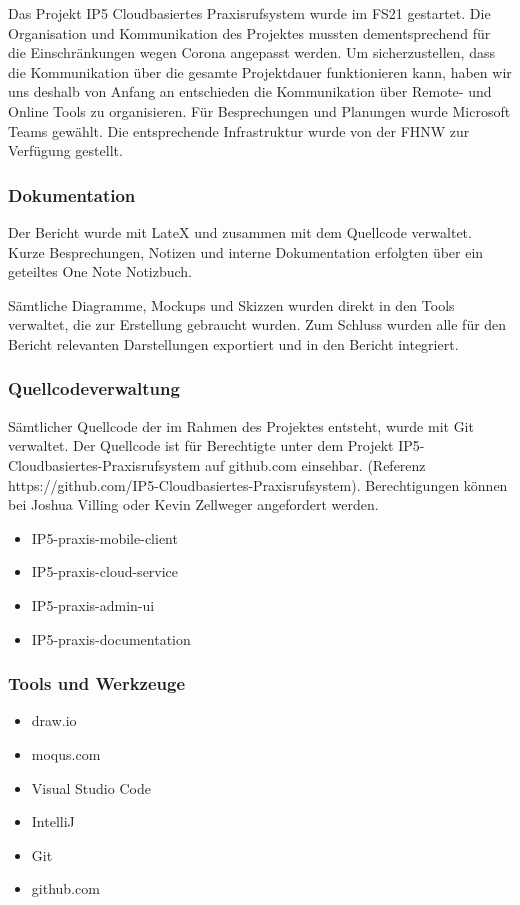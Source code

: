 Das Projekt IP5 Cloudbasiertes Praxisrufsystem wurde im FS21 gestartet. Die Organisation und Kommunikation des Projektes mussten dementsprechend für die Einschränkungen wegen Corona angepasst werden.
Um sicherzustellen, dass die Kommunikation über die gesamte Projektdauer funktionieren kann, haben wir uns deshalb von Anfang an entschieden die Kommunikation über Remote- und Online Tools zu organisieren.
Für Besprechungen und Planungen wurde Microsoft Teams gewählt. Die entsprechende Infrastruktur wurde von der FHNW zur Verfügung gestellt.

\subsubsection*{Dokumentation}

Der Bericht wurde mit LateX und zusammen mit dem Quellcode verwaltet. Kurze Besprechungen, Notizen und interne Dokumentation erfolgten über ein geteiltes One Note Notizbuch.

Sämtliche Diagramme, Mockups und Skizzen wurden direkt in den Tools verwaltet, die zur Erstellung gebraucht wurden. Zum Schluss wurden alle für den Bericht relevanten Darstellungen exportiert und in den Bericht integriert.

\subsubsection*{Quellcodeverwaltung}

Sämtlicher Quellcode der im Rahmen des Projektes entsteht, wurde mit Git verwaltet. Der Quellcode ist für Berechtigte unter dem Projekt IP5-Cloudbasiertes-Praxisrufsystem auf github.com einsehbar.
(Referenz https://github.com/IP5-Cloudbasiertes-Praxisrufsystem). Berechtigungen können bei Joshua Villing oder Kevin Zellweger angefordert werden.

\begin{itemize}
    \item IP5-praxis-mobile-client
    \item IP5-praxis-cloud-service
    \item IP5-praxis-admin-ui
    \item IP5-praxis-documentation
\end{itemize}

\subsubsection*{Tools und Werkzeuge}

\begin{itemize}
    \item draw.io
    \item moqus.com
    \item Visual Studio Code
    \item IntelliJ
    \item Git
    \item github.com
\end{itemize}
